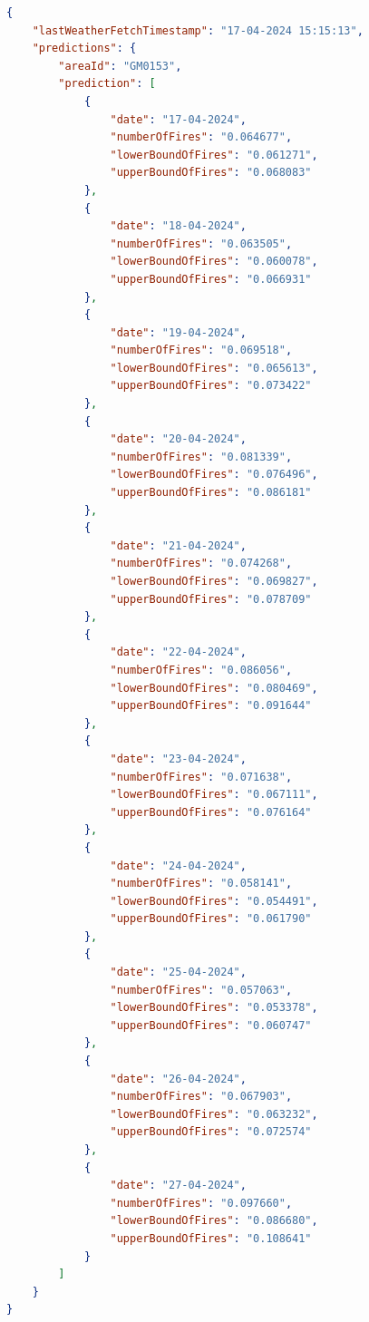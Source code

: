 \documentclass{utitcphd_overleaf}
\begin{document}
\begin{lstlisting}[language=json, caption=Example API Response]
{
    "lastWeatherFetchTimestamp": "17-04-2024 15:15:13",
    "predictions": {
        "areaId": "GM0153",
        "prediction": [
            {
                "date": "17-04-2024",
                "numberOfFires": "0.064677",
                "lowerBoundOfFires": "0.061271",
                "upperBoundOfFires": "0.068083"
            },
            {
                "date": "18-04-2024",
                "numberOfFires": "0.063505",
                "lowerBoundOfFires": "0.060078",
                "upperBoundOfFires": "0.066931"
            },
            {
                "date": "19-04-2024",
                "numberOfFires": "0.069518",
                "lowerBoundOfFires": "0.065613",
                "upperBoundOfFires": "0.073422"
            },
            {
                "date": "20-04-2024",
                "numberOfFires": "0.081339",
                "lowerBoundOfFires": "0.076496",
                "upperBoundOfFires": "0.086181"
            },
            {
                "date": "21-04-2024",
                "numberOfFires": "0.074268",
                "lowerBoundOfFires": "0.069827",
                "upperBoundOfFires": "0.078709"
            },
            {
                "date": "22-04-2024",
                "numberOfFires": "0.086056",
                "lowerBoundOfFires": "0.080469",
                "upperBoundOfFires": "0.091644"
            },
            {
                "date": "23-04-2024",
                "numberOfFires": "0.071638",
                "lowerBoundOfFires": "0.067111",
                "upperBoundOfFires": "0.076164"
            },
            {
                "date": "24-04-2024",
                "numberOfFires": "0.058141",
                "lowerBoundOfFires": "0.054491",
                "upperBoundOfFires": "0.061790"
            },
            {
                "date": "25-04-2024",
                "numberOfFires": "0.057063",
                "lowerBoundOfFires": "0.053378",
                "upperBoundOfFires": "0.060747"
            },
            {
                "date": "26-04-2024",
                "numberOfFires": "0.067903",
                "lowerBoundOfFires": "0.063232",
                "upperBoundOfFires": "0.072574"
            },
            {
                "date": "27-04-2024",
                "numberOfFires": "0.097660",
                "lowerBoundOfFires": "0.086680",
                "upperBoundOfFires": "0.108641"
            }
        ]
    }
}
\end{lstlisting}
\end{document}
